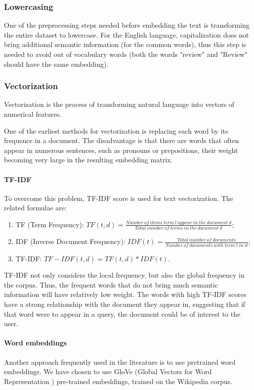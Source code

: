 \subsubsection{Lowercasing}
One of the preprocessing steps needed before embedding the text is transforming the entire dataset to lowercase. For the English language, capitalization does not bring additional semantic information (for the common words), thus this step is needed to avoid out of vocabulary words (both the words "review" and "Review" should have the same embedding).

\subsubsection{Vectorization}
Vectorization is the process of transforming natural language into vectors of numerical features.

One of the earliest methods for vectorization is replacing each word by its frequence in a document. The disadvantage is that there are words that often appear in numerous sentences, such as pronouns or prepositions, their weight becoming very large in the resulting embedding matrix.
\paragraph{TF-IDF}\label{tfidf}
To overcome this problem, TF-IDF score is used for text vectorization. The related formulae are:
\begin{enumerate}
    \item TF (Term Frequency):
    $TF(t,d)=\frac{Number\ of\ items\ term\ t\ appear\ in\ the\ document\ d}{Total\ number\ of\ terms\ in\ the\ document\ d}$;
    \item IDF (Inverse Document Frequency):
    $IDF(t)=\frac{Total\ number\ of\ documents}{Number\ of\ documents\ with\ term\ t\ in\ it}$;
    \item TF-IDF:
    $TF-IDF(t,d)=TF(t,d)*IDF(t)$.
\end{enumerate}
TF-IDF not only considers the local frequency, but also the global frequency in the corpus. Thus, the frequent words that do not bring much semantic information will have relatively low weight. The words with high TF-IDF scores have a strong relationship with the document they appear in, suggesting that if that word were to appear in a query, the document could be of interest to the user.\cite{TF-IDF}

\paragraph{Word embeddings}
Another approach frequently used in the literature is to use pretrained word embeddings. We have chosen to use GloVe (Global Vectors for Word Representation \cite{glove}) pre-trained embeddings, trained on the Wikipedia corpus.